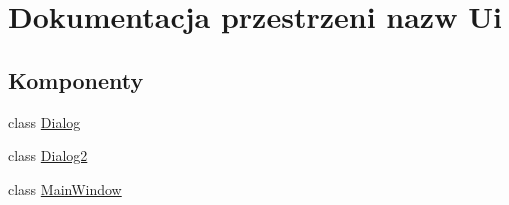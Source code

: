 \hypertarget{namespaceUi}{\section{Dokumentacja przestrzeni nazw Ui}
\label{namespaceUi}
}
\subsection*{Komponenty}
\begin{DoxyCompactItemize}
\item 
class \hyperlink{classUi_1_1Dialog}{Dialog}
\item 
class \hyperlink{classUi_1_1Dialog2}{Dialog2}
\item 
class \hyperlink{classUi_1_1MainWindow}{Main\-Window}
\end{DoxyCompactItemize}

